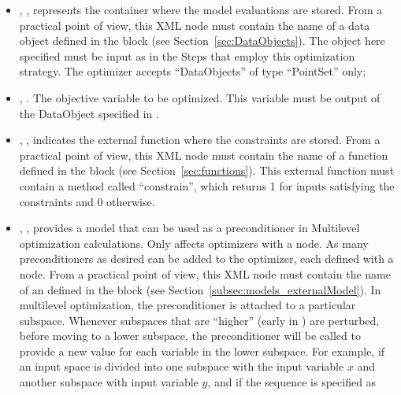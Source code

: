 \begin{itemize}
\item {}, ,
        represents the container where the model evaluations are stored.
        From a practical point of view, this XML node must contain the name of
        a data object defined in the  block (see
        Section~\ref{sec:DataObjects}). The object here specified must be
        input as   in the Steps that employ this optimization strategy.
        The  optimizer accepts ``DataObjects'' of type ``PointSet'' only;
        \item {}, . The objective variable to be optimized. This variable must be
          output of the DataObject specified in .
\item {}, ,
        indicates the external function where the constraints are stored. From a practical point of view, this XML node must contain the
        name of a function defined in the  block (see Section~\ref{sec:functions}). This external function must
        contain a method called ``constrain'', which returns 1 for inputs satisfying the constraints and 0 otherwise.
\item {}, ,
        provides a model that can be used as a preconditioner in Multilevel optimization calculations.  Only
        affects optimizers with a  node.  As many preconditioners as desired can be added
        to the optimizer, each defined with a  node.
        From a practical point of view, this XML node must contain the name of
        an  defined in the  block (see
        Section~\ref{subsec:models_externalModel}).
        In multilevel optimization, the preconditioner is attached to a particular subspace.  Whenever
        subspaces that are ``higher'' (early in ) are perturbed, before moving to a lower
        subspace, the preconditioner will be called to provide a new value for each variable in the lower
        subspace.
        For example, if an input space is divided into one subspace  with the input variable $x$ and
        another subspace  with input variable $y$, and if the sequence is specified as

\end{itemize}
